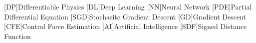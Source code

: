 [DP]{Differentiable Physics}
[DL]{Deep Learning}
[NN]{Neural Network}
[PDE]{Partial Differential Equation}
[SGD]{Stochasitc Gradient Descent}
[GD]{Gradient Descent}
[CFE]{Control Force Estimation}
[AI]{Artificial Intelligence}
[SDF]{Signed Distance Function}
